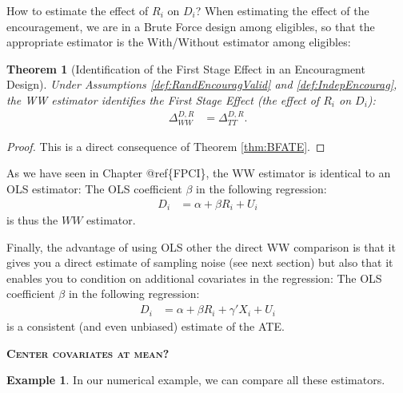 \documentclass[
]{book}
\newtheorem{theorem}{Theorem}[chapter]
\theoremstyle{definition}
\theoremstyle{definition}
\newtheorem{example}{Example}[chapter]
\theoremstyle{definition}
\theoremstyle{definition}
\theoremstyle{remark}
\begin{document}
How to estimate the effect of \(R_i\) on \(D_i\)?
When estimating the effect of the encouragement, we are in a Brute Force design among eligibles, so that the appropriate estimator is the With/Without estimator among eligibles:

\begin{theorem}[Identification of the First Stage Effect in an Encouragment Design]
\protect\hypertarget{thm:EncouragFStage}{}{\label{thm:EncouragFStage} \iffalse (Identification of the First Stage Effect in an Encouragment Design) \fi{} }Under Assumptions \ref{def:RandEncouragValid} and \ref{def:IndepEncourag}, the WW estimator identifies the First Stage Effect (the effect of \(R_i\) on \(D_i\)):
\begin{align*}
  \Delta^{D,R}_{WW} & = \Delta^{D,R}_{TT}.
\end{align*}
\end{theorem}

\begin{proof}
\iffalse{} {Proof. } \fi{}This is a direct consequence of Theorem \ref{thm:BFATE}.
\end{proof}

As we have seen in Chapter @ref\{FPCI\}, the WW estimator is identical to an OLS estimator:
The OLS coefficient \(\beta\) in the following regression:
\begin{align*}
    D_i &  = \alpha +  \beta R_i + U_i
    \end{align*}
is thus the \(WW\) estimator.

Finally, the advantage of using OLS other the direct WW comparison is that it gives you a direct estimate of sampling noise (see next section) but also that it enables you to condition on additional covariates in the regression:
The OLS coefficient \(\beta\) in the following regression:
\begin{align*}
    D_i &  = \alpha +  \beta R_i + \gamma' X_i + U_i
    \end{align*}
is a consistent (and even unbiased) estimate of the ATE.

\textbf{\textsc{Center covariates at mean?}}

\begin{example}
\protect\hypertarget{exm:unnamed-chunk-119}{}{\label{exm:unnamed-chunk-119} }In our numerical example, we can compare all these estimators.
\end{example}
\end{document}
